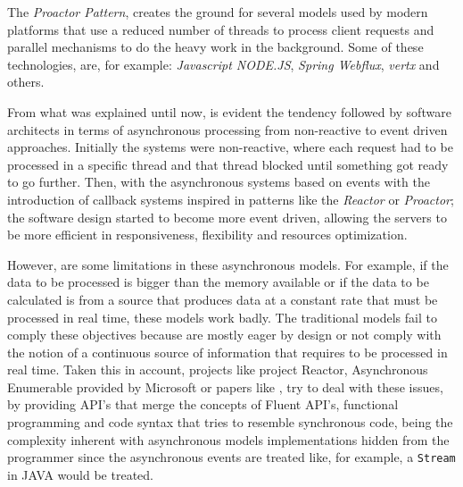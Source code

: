The \textit{Proactor Pattern}, creates the ground for several models used by modern platforms that use a reduced number of threads to process client requests and parallel mechanisms to do the heavy work in the background. Some of these technologies, are, for example: \textit{Javascript NODE.JS}, \textit{Spring Webflux}, \textit{vertx} and others.

From what was explained until now, is evident the tendency followed by software architects in terms of asynchronous processing from non-reactive to event driven approaches. Initially the systems were non-reactive, where each request had to be processed in a 
specific thread and that thread blocked until something got ready to go further. 
Then, with the asynchronous systems based on events with the introduction of callback systems inspired in patterns like the \textit{Reactor} or \textit{Proactor}; the software design started to become more event driven, allowing the servers to be more efficient in responsiveness, flexibility and resources optimization. 

However, are some limitations in these asynchronous models. For example, if the data to be processed is bigger than the memory available or if the data to be calculated is from a source that produces data at a constant rate that must be processed in real time, these models work badly.  
The traditional models fail to comply these objectives because are mostly eager by design or not comply with the notion of a continuous source of information that requires to be processed in real time.
Taken this in account, projects like project Reactor, Asynchronous Enumerable provided by Microsoft or papers like \cite{LAZYVSEAGER}, try to deal with these issues, by providing API's that merge the concepts of Fluent API's, functional programming and code syntax that tries to resemble synchronous code, being the complexity inherent with asynchronous models implementations hidden from the programmer since the asynchronous events are treated like, for example, a \texttt{Stream} in JAVA would be treated.

\clearpage




